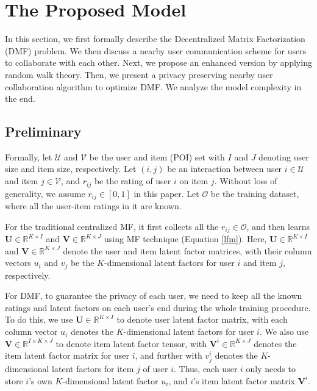\section{The Proposed Model}\label{model}
In this section, we first formally describe the Decentralized Matrix Factorization (DMF) problem. 
We then discuss a nearby user communication scheme for users to collaborate with each other. 
Next, we propose an enhanced version by applying random walk theory. 
Then, we present a privacy preserving nearby user collaboration algorithm to optimize DMF. 
We analyze the model complexity in the end.%

\subsection{Preliminary}



Formally, let $\mathcal{U}$ and $\mathcal{V}$ be the user and item (POI) set with $I$ and $J$ denoting user size and item size, respectively. 
Let $(i,j)$ be an interaction between user $i \in \mathcal{U}$ and item $j \in \mathcal{V}$, and $r_{ij}$ be the rating of user $i$ on item $j$. 
Without loss of generality, we assume $r_{ij} \in [0,1]$ in this paper. 
Let $\mathcal{O}$ be the training dataset, where all the user-item ratings in it are known. 

For the traditional centralized MF, it first collects all the $r_{ij} \in \mathcal{O}$, and then learns $\textbf{U}\in \mathbb{R}^{K\times{}I}$ and $\textbf{V}\in \mathbb{R}^{K\times{}J}$ using MF technique (Equation \ref{lfm}). 
Here, $\textbf{U}\in \mathbb{R}^{K\times{}I}$ and $\textbf{V}\in \mathbb{R}^{K\times{}J}$ denote the user and item latent factor matrices, with their column vectors $u_i$ and $v_j$ be the $K$-dimensional latent factors for user $i$ and item $j$, respectively.

For DMF, to guarantee the privacy of each user, we need to keep all the known ratings and latent factors on each user's end during the whole training procedure. 
To do this, we use $\textbf{U}\in \mathbb{R}^{K\times{}I}$ to denote user latent factor matrix, with each column vector $u_i$ denotes the $K$-dimensional latent factors for user $i$. 
We also use $\textbf{V}\in \mathbb{R}^{I\times{}K\times{}J}$ to denote item latent factor tensor, with $\textbf{V}^i\in \mathbb{R}^{K\times{}J}$ denotes the item latent factor matrix for user $i$, and further with $v^i_j$ denotes the $K$-dimensional latent factors for item $j$ of user $i$. 
Thus, each user $i$ only needs to store $i$'s own $K$-dimensional latent factor $u_i$, and $i$'s item latent factor matrix $\textbf{V}^i$.

